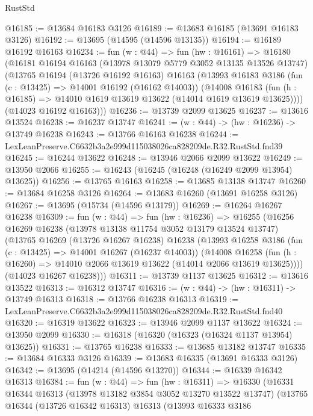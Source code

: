 \begin{lexlean}{RustStd}
\begin{coremodule}
@16185 := @13684 @16183 @3126
@16189 := @13683 @16185 (@13691 @16183 @3126)
@16192 := @13695 (@14595 (@14596 @13135))
@16194 := @16189 @16192 @16163
@16234 := fun (w : @44) =>
  fun (hw : @16161) =>
  @16180
    (@16181
      @16194
      @16163
      (@13978 @13079 @5779 @3052 @13135 @13526 @13747)
      (@13765
        @16194
        (@13726 @16192 @16163)
        @16163
        (@13993
          @16183
          @3186
          (fun (c : @13425) => @14001 @16192 (@16162 @14003))
          (@14008
            @16183
            (fun (h : @16185) => @14010 @1619 @13619 @13622 (@14014 @1619 @13619 @13625))))
        (@14023 @16192 @16163)))
@16236 := @13739 @2099 @13625
@16237 := @13616 @13524
@16238 := @16237 @13747
@16241 := (w : @44) -> (hw : @16236) -> @13749 @16238
@16243 := @13766 @16163 @16238
@16244 := LexLeanPreserve.C6632b3a2e999d115038026ca828209de.R32.RustStd.fnd39
@16245 := @16244 @13622
@16248 := @13946 @2066 @2099 @13622
@16249 := @13950 @2066
@16255 := @16243 (@16245 (@16248 (@16249 @2099 @13954) @13625))
@16256 := @13765 @16163
@16258 := @13685 @13138 @13747
@16260 := @13684 @16258 @3126
@16264 := @13683 @16260 (@13691 @16258 @3126)
@16267 := @13695 (@15734 (@14596 @13179))
@16269 := @16264 @16267 @16238
@16309 := fun (w : @44) =>
  fun (hw : @16236) =>
  @16255
    (@16256
      @16269
      @16238
      (@13978 @13138 @11754 @3052 @13179 @13524 @13747)
      (@13765
        @16269
        (@13726 @16267 @16238)
        @16238
        (@13993
          @16258
          @3186
          (fun (c : @13425) => @14001 @16267 (@16237 @14003))
          (@14008
            @16258
            (fun (h : @16260) => @14010 @2066 @13619 @13622 (@14014 @2066 @13619 @13625))))
        (@14023 @16267 @16238)))
@16311 := @13739 @1137 @13625
@16312 := @13616 @13522
@16313 := @16312 @13747
@16316 := (w : @44) -> (hw : @16311) -> @13749 @16313
@16318 := @13766 @16238 @16313
@16319 := LexLeanPreserve.C6632b3a2e999d115038026ca828209de.R32.RustStd.fnd40
@16320 := @16319 @13622
@16323 := @13946 @2099 @1137 @13622
@16324 := @13950 @2099
@16330 := @16318 (@16320 (@16323 (@16324 @1137 @13954) @13625))
@16331 := @13765 @16238
@16333 := @13685 @13182 @13747
@16335 := @13684 @16333 @3126
@16339 := @13683 @16335 (@13691 @16333 @3126)
@16342 := @13695 (@14214 (@14596 @13270))
@16344 := @16339 @16342 @16313
@16384 := fun (w : @44) =>
  fun (hw : @16311) =>
  @16330
    (@16331
      @16344
      @16313
      (@13978 @13182 @3854 @3052 @13270 @13522 @13747)
      (@13765
        @16344
        (@13726 @16342 @16313)
        @16313
        (@13993
          @16333
          @3186

\end{coremodule}
\end{lexlean}

